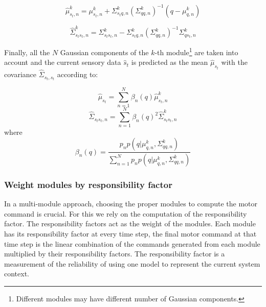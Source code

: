 \begin{equation}
{
\hat{\mu}_{s_t,n}^k = {\mu}_{s_t,n}^k + \Sigma_{{s_t}q,n}^k({\Sigma}_{qq,n}^k)^{-1}(q-{\mu}_{q,n}^k)
}
\end{equation}

\begin{equation}
{
\hat{\Sigma}_{{s_t}{s_t},n}^k = {\Sigma}_{{s_t}{s_t},n}^k - {\Sigma}_{{s_t}q,n}^k({\Sigma}_{qq,n}^k)^{-1}{\Sigma}_{q{s_t},n}^k
}
\end{equation}


Finally, all the $N$ Gaussian components of the $k$-th module\footnote{Different modules may have different number of Gaussian components.} are taken into account and the current sensory data $\hat{s}_t$ is predicted as the mean $\hat{\mu}_{s_t}$ with the covariance $\hat{\Sigma}_{s_t,s_t}$ according to:

\begin{equation}
{
\hat{\mu}_{s_t} = \sum_{n=1}^N{\beta_n(q)}\hat{\mu}_{s_t,n}^k
}
\end{equation}
\begin{equation}
{
\hat{\Sigma}_{{s_t}{s_t},n} = \sum_{n=1}^N{\beta_n(q)}^2\hat{\Sigma}_{{s_t}{s_t},n}^k
}
\end{equation}
where
\begin{equation}
{
\beta_n(q) = \frac{p_{n}p(q|{\mu}_{q,n}^k,{\Sigma}_{qq,n}^k)}
{\sum_{n=1}^N{p_n}p(q|{\mu}_{q,n}^k,{\Sigma}_{qq,n}^k)}
}
\end{equation}



\subsubsection{Weight modules by responsibility factor}
\label{cha4:sec2:control:rf}

In a multi-module approach, choosing the proper modules to compute the motor command is crucial. For this we rely on the computation of the responsibility factor. The responsibility factors act as the weight of the modules. Each module has its responsibility factor at every time step, the final motor command at that time step is the linear combination of the commands generated from each module multiplied by their responsibility factors.
The responsibility factor is a measurement of the reliability of using one model to represent the current system context.
%
%

